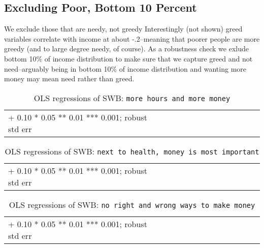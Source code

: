 \documentclass[10pt, letterpaper]{article}
\begin{document}
\begin{spacing}{1.8}
\section{Excluding Poor, Bottom 10 Percent}

We exclude those that are needy, not greedy
Interestingly (not shown) greed variables correlate with income at about -.2--meaning that
poorer people are more greedy (and to large degree needy, of course). As a
robustness check we exlude bottom 10\% of income distribution to make sure that we capture greed and not need--arguably being in bottom
10\% of income distribution and wanting more money may mean need rather than greed. 


\begin{spacing}{.9} \begin{table}[H]\centering  \label{a} \begin{scriptsize} \begin{tabular}{p{1.8in}p{.5in}p{.5in}p{.5in}p{.5in}p{.5in}p{.5in}p{.5in}p{.5in}p{.5in}p{.5 in}p{.5in}p{.5 in}}\hline  \hline + 0.10 * 0.05 ** 0.01 *** 0.001; robust std err \end{tabular}\end{scriptsize}\caption{OLS regressions of SWB: \texttt{more hours and more money}}\end{table} \end{spacing}

\begin{spacing}{.9} \begin{table}[H]\centering  \label{b} \begin{scriptsize} \begin{tabular}{p{1.8in}p{.5in}p{.5in}p{.5in}p{.5in}p{.5in}p{.5in}p{.5in}p{.5in}p{.5in}p{.5 in}p{.5in}p{.5 in}}\hline  \hline + 0.10 * 0.05 ** 0.01 *** 0.001; robust std err \end{tabular}\end{scriptsize}\caption{OLS regressions of SWB:  \texttt{next to  health, money is most  important}}\end{table} \end{spacing}

\begin{spacing}{.9} \begin{table}[H]\centering  \label{c} \begin{scriptsize} \begin{tabular}{p{1.8in}p{.5in}p{.5in}p{.5in}p{.5in}p{.5in}p{.5in}p{.5in}p{.5in}p{.5in}p{.5 in}p{.5in}p{.5 in}}\hline  \hline + 0.10 * 0.05 ** 0.01 *** 0.001; robust std err \end{tabular}\end{scriptsize}\caption{OLS regressions of SWB:  \texttt{no right  and wrong ways to  make money}}\end{table} \end{spacing}


\end{spacing}
\end{document}
